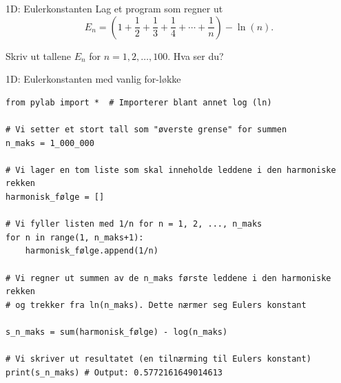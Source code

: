 \cyanheader
\begin{frame}[t]{1D: Eulerkonstanten}
Lag et program som regner ut
\[
E_n = \left(1 + \frac{1}{2} + \frac{1}{3} + \frac{1}{4} + \cdots + \frac{1}{n}\right) - \ln(n).
\]

\medskip
Skriv ut tallene $E_n$ for $n = 1,2,\ldots,100$. Hva ser du?

\end{frame}

\cyanheader
\begin{frame}[fragile]{1D: Eulerkonstanten med vanlig for-løkke}
\begin{verbatim}
from pylab import *  # Importerer blant annet log (ln)

# Vi setter et stort tall som "øverste grense" for summen
n_maks = 1_000_000  

# Vi lager en tom liste som skal inneholde leddene i den harmoniske rekken
harmonisk_følge = []  

# Vi fyller listen med 1/n for n = 1, 2, ..., n_maks
for n in range(1, n_maks+1):
    harmonisk_følge.append(1/n)

# Vi regner ut summen av de n_maks første leddene i den harmoniske rekken
# og trekker fra ln(n_maks). Dette nærmer seg Eulers konstant

s_n_maks = sum(harmonisk_følge) - log(n_maks)

# Vi skriver ut resultatet (en tilnærming til Eulers konstant)
print(s_n_maks) # Output: 0.5772161649014613
\end{verbatim}
\end{frame}

